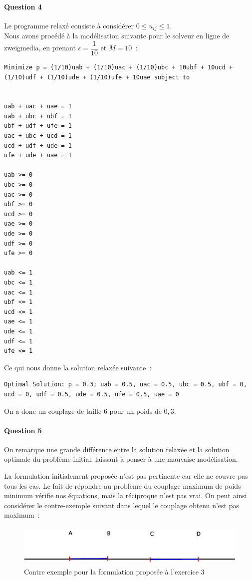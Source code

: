 \paragraph{Question 4}
Le programme relaxé consiste à considérer $0 \leq u_{ij} \leq 1$. \\
Nous avons procédé à la modélisation suivante pour le solveur en ligne
de zweigmedia, en prenant $\epsilon = \dfrac{1}{10}$ et $M=10$~:
\begin{lstlisting}
Minimize p = (1/10)uab + (1/10)uac + (1/10)ubc + 10ubf + 10ucd +
(1/10)udf + (1/10)ude + (1/10)ufe + 10uae subject to


uab + uac + uae = 1 
uab + ubc + ubf = 1 
ubf + udf + ufe = 1 
uac + ubc + ucd = 1 
ucd + udf + ude = 1
ufe + ude + uae = 1 

uab >= 0
ubc >= 0
uac >= 0
ubf >= 0
ucd >= 0
uae >= 0
ude >= 0
udf >= 0
ufe >= 0

uab <= 1
ubc <= 1
uac <= 1
ubf <= 1
ucd <= 1
uae <= 1
ude <= 1
udf <= 1
ufe <= 1
\end{lstlisting}

Ce qui nous donne la solution relaxée suivante~:
\begin{lstlisting}
Optimal Solution: p = 0.3; uab = 0.5, uac = 0.5, ubc = 0.5, ubf = 0,
ucd = 0, udf = 0.5, ude = 0.5, ufe = 0.5, uae = 0
\end{lstlisting}
On a donc un couplage de taille $6$ pour un poids de $0,3$.

\paragraph{Question 5}
On remarque une grande différence entre la solution relaxée et la
solution optimale du problème initial, laissant à penser à une
mauvaise modélisation.


La formulation initialement proposée n'est pas pertinente car elle ne
couvre pas tous les cas. Le fait de répondre au problème du couplage
maximum de poids minimum vérifie nos équations, mais la réciproque
n'est pas vrai. On peut ainsi considérer le contre-exemple suivant
dans lequel le couplage obtenu n'est pas maximum~:
\begin{figure}[!ht]
\begin{center}
\includegraphics[height=2cm]{../images/exo3.eps}
\end{center}
\caption{Contre exemple pour la formulation proposée à l'exercice 3}
\end{figure}

